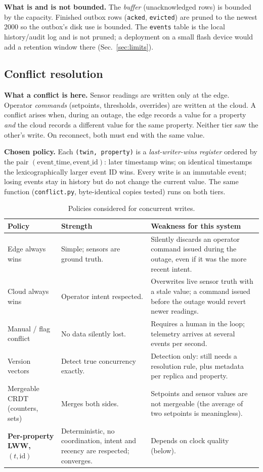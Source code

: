 \documentclass[11pt,a4paper]{article}
\begin{document}
\textbf{What is and is not bounded.} The \emph{buffer} (unacknowledged rows) is bounded by the capacity.
Finished outbox rows (\texttt{acked}, \texttt{evicted}) are pruned to the newest 2000 so the outbox's disk use
is bounded. The \texttt{events} table is the local history/audit log and is not pruned; a deployment on
a small flash device would add a retention window there (Sec.~\ref{sec:limits}).

\subsection{Conflict resolution}\label{sec:conflict}
\textbf{What a conflict is here.} Sensor readings are written only at the edge. Operator \emph{commands}
(setpoints, thresholds, overrides) are written at the cloud. A conflict arises when, during an outage, the
edge records a value for a property \emph{and} the cloud records a different value for the same property.
Neither tier saw the other's write. On reconnect, both must end with the same value.

\textbf{Chosen policy.} Each \texttt{(twin, property)} is a \emph{last-writer-wins register} ordered by the
pair $(\text{event\_time}, \text{event\_id})$: later timestamp wins; on identical timestamps the
lexicographically larger event ID wins. Every write is an immutable event; losing events stay in history
but do not change the current value. The same function (\texttt{conflict.py}, byte-identical copies tested)
runs on both tiers.

\begin{table}[H]\centering\small
\caption{Policies considered for concurrent writes.}
\begin{tabularx}{\textwidth}{>{\raggedright}p{2.7cm}>{\raggedright}X>{\raggedright\arraybackslash}X}
\toprule
Policy & Strength & Weakness for this system\\\midrule
Edge always wins & Simple; sensors are ground truth. & Silently discards an operator command issued during the outage, even if it was the more recent intent.\\
Cloud always wins & Operator intent respected. & Overwrites live sensor truth with a stale value; a command issued before the outage would revert newer readings.\\
Manual / flag conflict & No data silently lost. & Requires a human in the loop; telemetry arrives at several events per second.\\
Version vectors & Detect true concurrency exactly. & Detection only: still needs a resolution rule, plus metadata per replica and property.\\
Mergeable CRDT (counters, sets) & Merges both sides. & Setpoints and sensor values are not mergeable (the average of two setpoints is meaningless).\\
\textbf{Per-property LWW, $(t,\text{id})$} & Deterministic, no coordination, intent and recency are respected; converges. & Depends on clock quality (below).\\\bottomrule
\end{tabularx}
\end{table}
\end{document}
